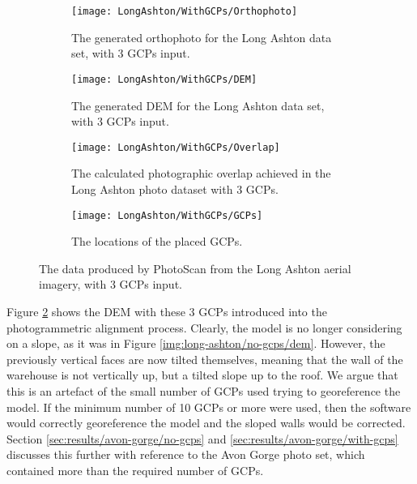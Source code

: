 \begin{figure}
    \centering
    \begin{subfigure}[b]{0.45\textwidth}
        \texttt{[image: LongAshton/WithGCPs/Orthophoto]}
        \caption{The generated orthophoto for the Long Ashton data set, with 3
        GCPs input.}
        \label{img:long-ashton/with-gcps/orthophoto}
    \end{subfigure}
    \begin{subfigure}[b]{0.45\textwidth}
        \texttt{[image: LongAshton/WithGCPs/DEM]}
        \caption{The generated DEM for the Long Ashton data set, with 3 GCPs
        input.}
        \label{img:long-ashton/with-gcps/dem}
    \end{subfigure}
    \begin{subfigure}[b]{0.45\textwidth}
        \texttt{[image: LongAshton/WithGCPs/Overlap]}
        \caption{The calculated photographic overlap achieved in the Long Ashton
        photo dataset with 3 GCPs.}
        \label{img:long-ashton/with-gcps/overlap}
    \end{subfigure}
    \begin{subfigure}[b]{0.45\textwidth}
        \texttt{[image: LongAshton/WithGCPs/GCPs]}
        \caption{The locations of the placed GCPs.}
        \label{img:long-ashton/with-gcps/gcps}
    \end{subfigure}
    \caption{The data produced by PhotoScan from the Long Ashton aerial imagery,
    with 3 GCPs input.}
    \label{img:long-ashton/with-gcps}
\end{figure}

Figure \ref{img:long-ashton/with-gcps/dem} shows the DEM with these 3 GCPs
introduced into the photogrammetric alignment process. Clearly, the model is no
longer considering on a slope, as it was in Figure
\ref{img:long-ashton/no-gcps/dem}. However, the previously vertical faces are
now tilted themselves, meaning that the wall of the warehouse is not vertically
up, but a tilted slope up to the roof. We argue that this is an artefact of the
small number of GCPs used trying to georeference the model. If the minimum
number of 10 GCPs or more were used, then the software would correctly
georeference the model and the sloped walls would be corrected. Section
\ref{sec:results/avon-gorge/no-gcps} and \ref{sec:results/avon-gorge/with-gcps}
discusses this further with reference to the Avon Gorge photo set, which
contained more than the required number of GCPs.

